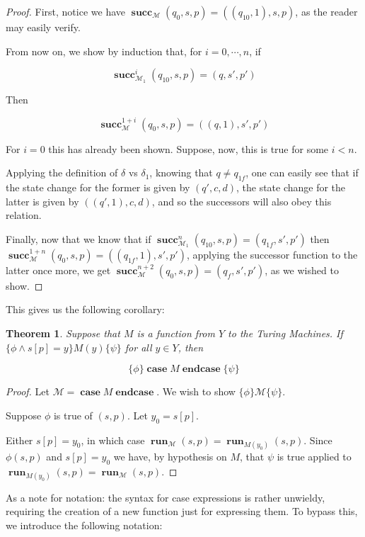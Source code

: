 \documentclass{article}
\newtheorem{theorem}{Theorem}
\newcommand{\M}{\mathcal{M}}
\DeclareMathOperator{\suc}{\mathbf{succ}}
\DeclareMathOperator{\run}{\mathbf{run}}
\DeclareMathOperator{\Ncase}{\mathbf{case}}
\DeclareMathOperator{\Nendcase}{\mathbf{endcase}}
\begin{document}
	\begin{proof}
	First, notice we have $\suc_\M (q_0, s, p) = ((q_{10}, 1), s, p)$, as the reader may easily verify.
	
	From now on, we show by induction that, for $i = 0, \cdots, n$, if
	
	\[\suc^i_{\M_1} (q_{10}, s, p) = (q, s', p')\]
	
	Then
	
	\[\suc^{1+i}_\M (q_0, s, p) = ((q, 1), s', p')\]
	
	For $i = 0$ this has already been shown. Suppose, now, this is true for some $i < n$.
	
	Applying the definition of $\delta$ vs $\delta_1$, knowing that $q \neq q_{1f}$, one can easily see that if the state change for the former is given by $(q', c, d)$, the state change for the latter is given by $((q', 1), c, d)$, and so the successors will also obey this relation.
	
	Finally, now that we know that if $\suc^n_{\M_1} (q_{10}, s, p) = (q_{1f}, s', p')$ then $\suc^{1+n}_\M (q_0, s, p) = ((q_{1f}, 1), s', p')$, applying the successor function to the latter once more, we get $\suc^{n+2}_\M (q_0, s, p) = (q_f, s', p')$, as we wished to show.
	\end{proof}
	
	This gives us the following corollary:
	
	\begin{theorem}
	Suppose that $M$ is a function from $Y$ to the Turing Machines. If $\{\phi \land s[p] = y\} M(y) \{\psi\}$ for all $y \in Y$, then
	
	\[\{\phi\} \Ncase M \Nendcase \{\psi\}\]
	\end{theorem}
	
	\begin{proof}
	Let $\M = \Ncase M \Nendcase$. We wish to show $\{\phi\}\M\{\psi\}$.
	
	Suppose $\phi$ is true of $(s,p)$. Let $y_0 = s[p]$.
	
	Either $s[p] = y_0$, in which case $\run_\M(s,p) = \run_{M(y_0)}(s,p)$. Since $\phi(s,p)$ and $s[p] = y_0$ we have, by hypothesis on $M$, that $\psi$ is true applied to $\run_{M(y_0)}(s,p) = \run_\M(s,p)$.
	\end{proof}
	
	As a note for notation: the syntax for case expressions is rather unwieldy, requiring the creation of a new function just for expressing them. To bypass this, we introduce the following notation:
	
\end{document}
